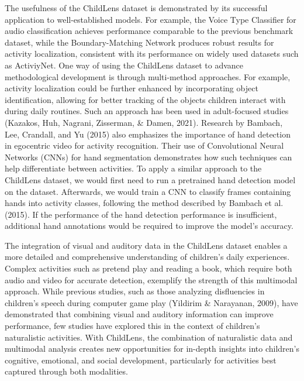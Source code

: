 \documentclass[
  man,floatsintext]{apa6}
\begin{document}
The usefulness of the ChildLens dataset is demonstrated by its successful application to well-established models. For example, the Voice Type Classifier for audio classification achieves performance comparable to the previous benchmark dataset, while the Boundary-Matching Network produces robust results for activity localization, consistent with its performance on widely used datasets such as ActiviyNet. One way of using the ChildLens dataset to advance methodological development is through multi-method approaches. For example, activity localization could be further enhanced by incorporating object identification, allowing for better tracking of the objects children interact with during daily routines. Such an approach has been used in adult-focused studies (Kazakos, Huh, Nagrani, Zisserman, \& Damen, 2021). Research by Bambach, Lee, Crandall, and Yu (2015) also emphasizes the importance of hand detection in egocentric video for activity recognition. Their use of Convolutional Neural Networks (CNNs) for hand segmentation demonstrates how such techniques can help differentiate between activities. To apply a similar approach to the ChildLens dataset, we would first need to run a pretrained hand detection model on the dataset. Afterwards, we would train a CNN to classify frames containing hands into activity classes, following the method described by Bambach et al. (2015). If the performance of the hand detection performance is insufficient, additional hand annotations would be required to improve the model's accuracy.

The integration of visual and auditory data in the ChildLens dataset enables a more detailed and comprehensive understanding of children's daily experiences. Complex activities such as pretend play and reading a book, which require both audio and video for accurate detection, exemplify the strength of this multimodal approach. While previous studies, such as those analyzing disfluencies in children's speech during computer game play (Yildirim \& Narayanan, 2009), have demonstrated that combining visual and auditory information can improve performance, few studies have explored this in the context of children's naturalistic activities. With ChildLens, the combination of naturalistic data and multimodal analysis creates new opportunities for in-depth insights into children's cognitive, emotional, and social development, particularly for activities best captured through both modalities.
\end{document}
